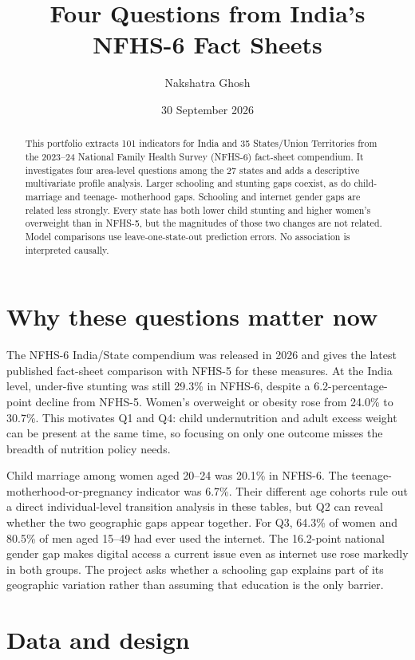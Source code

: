 \documentclass[11pt,a4paper]{article}
\title{Four Questions from India's NFHS-6 Fact Sheets}
\author{Nakshatra Ghosh}
\date{30 September 2026}
\begin{document}
\maketitle

\begin{abstract}
This portfolio extracts 101 indicators for India and 35 States/Union
Territories from the 2023--24 National Family Health Survey (NFHS-6)
fact-sheet compendium. It investigates four area-level questions among the
27 states and adds a descriptive multivariate profile analysis. Larger
schooling and stunting gaps coexist, as do child-marriage and teenage-
motherhood gaps. Schooling and internet gender gaps are related less
strongly. Every state has both lower child stunting and higher women's
overweight than in NFHS-5, but the magnitudes of those two changes are not
related. Model comparisons use leave-one-state-out prediction errors.
No association is interpreted causally.
\end{abstract}

\section{Why these questions matter now}

The NFHS-6 India/State compendium was released in 2026 and gives the
latest published fact-sheet comparison with NFHS-5 for these measures.
At the India level, under-five stunting was still 29.3\% in NFHS-6,
despite a 6.2-percentage-point decline from NFHS-5. Women's overweight
or obesity rose from 24.0\% to 30.7\%. This motivates Q1 and Q4:
child undernutrition and adult excess weight can be present at the same
time, so focusing on only one outcome misses the breadth of nutrition
policy needs.

Child marriage among women aged 20--24 was 20.1\% in NFHS-6. The
teenage-motherhood-or-pregnancy indicator was 6.7\%. Their different
age cohorts rule out a direct individual-level transition analysis in
these tables, but Q2 can reveal whether the two geographic gaps appear
together. For Q3, 64.3\% of women and 80.5\% of men aged 15--49 had
ever used the internet. The 16.2-point national gender gap makes digital
access a current issue even as internet use rose markedly in both groups.
The project asks whether a schooling gap explains part of its geographic
variation rather than assuming that education is the only barrier.

\section{Data and design}
\end{document}
